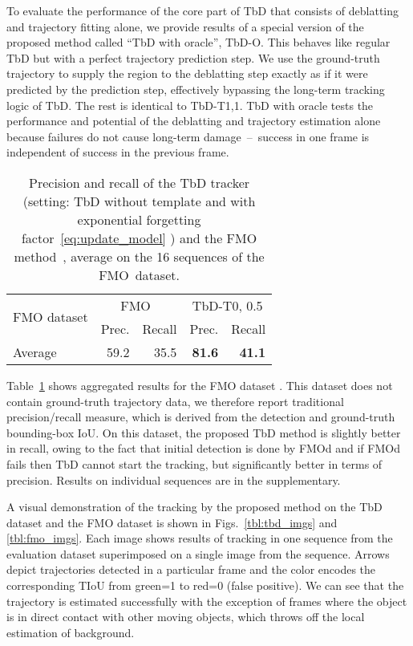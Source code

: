 \documentclass[10pt,twocolumn,letterpaper]{article}
\begin{document}
To evaluate the performance of the core part of TbD that consists of deblatting and trajectory fitting alone, we provide results of a special version of the proposed method called ``TbD with oracle'', TbD-O. This behaves like regular TbD but with a perfect trajectory prediction step. We use the ground-truth trajectory to supply the region  to the deblatting step exactly as if it were predicted by the prediction step, effectively bypassing the long-term tracking logic of TbD. The rest is identical to TbD-T1,1. TbD with oracle tests the performance and potential of the deblatting and trajectory estimation alone because failures do not cause long-term damage~--~success in one frame is independent of success in the previous frame.


\begin{table}
\begin{center}
\begin{tabular}{l|r|r|r|r}
\hline
\multirow{2}{*}{FMO dataset}  &  \multicolumn{2}{c|}{FMO~\cite{fmo}} &  \multicolumn{2}{c}{TbD-T0, 0.5}  \\  \cline{2-5}
 &  Prec.  & Recall  & Prec. & Recall  \\ 
\hline
Average &  59.2 & 35.5 & \textbf{81.6} & \textbf{41.1} \\
\hline
\end{tabular}
\end{center}
\caption{Precision and recall of the TbD tracker (setting: TbD without template and with exponential forgetting factor~\eqref{eq:update_model} ) and the FMO method~\cite{fmo}, average on the 16 sequences of the FMO~dataset. 
}
\label{tbl:fmo}
\end{table}




%
 Table~\ref{tbl:fmo} shows aggregated results for the FMO dataset \cite{fmo}. This dataset does not contain ground-truth trajectory data, we therefore report traditional precision/recall measure, which is derived from the detection and ground-truth bounding-box IoU. On this dataset, the proposed TbD method is slightly better in recall, owing to the fact that initial detection is done by FMOd and if FMOd fails then TbD cannot start the tracking, but significantly better in terms of precision. Results on individual sequences are in the supplementary.

A visual demonstration of the tracking by the proposed method on the TbD dataset and the FMO dataset is shown in Figs.~\ref{tbl:tbd_imgs} and \ref{tbl:fmo_imgs}.
Each image shows results of tracking in one sequence from the evaluation dataset superimposed on a single image from the sequence. Arrows depict trajectories detected in a particular frame and the color encodes the corresponding TIoU from green=1 to red=0 (false positive). We can see that the trajectory is estimated successfully with the exception of frames where the object is in direct contact with other moving objects, which throws off the local estimation of background.
\end{document}
